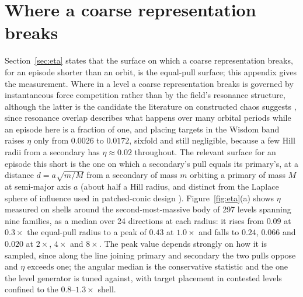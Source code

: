 \section{Where a coarse representation breaks}
\label{app:equalpull}

Section~\ref{sec:eta} states that the surface on which a coarse
representation breaks, for an episode shorter than an orbit, is the
equal-pull surface; this appendix gives the measurement.
Where in a level a coarse representation breaks is governed by instantaneous
force competition rather than by the field's resonance structure, although
the latter is the candidate the literature on constructed chaos suggests
\cite{chirikov1979,wisdom1980,deck2013}, since resonance overlap describes
what happens over many orbital periods while an episode here is a fraction
of one, and placing targets in the Wisdom band raises $\eta$ only from
$0.0026$ to $0.0172$, sixfold and still negligible, because a few Hill
radii from a secondary has $\eta \approx 0.02$ throughout. The relevant
surface for an episode this short is the one on which a secondary's pull
equals its primary's, at a distance $d = a\sqrt{m/M}$ from a secondary of
mass $m$ orbiting a primary of mass $M$ at semi-major axis $a$ (about half a
Hill radius, and distinct from the Laplace sphere of influence used in
patched-conic design \cite{bate1971}). Figure~\ref{fig:eta}(a) shows $\eta$
measured on shells around the second-most-massive body of 297 levels
spanning nine families, as a median over 24 directions at each radius: it
rises from $0.09$ at $0.3\times$ the equal-pull radius to a peak of $0.43$
at $1.0\times$ and falls to $0.24$, $0.066$ and $0.020$ at $2\times$,
$4\times$ and $8\times$. The peak value depends strongly on how it is
sampled, since along the line joining primary and secondary the two pulls
oppose and $\eta$ exceeds one; the angular median is the conservative
statistic and the one the level generator is tuned against, with target
placement in contested levels confined to the $0.8$--$1.3\times$ shell.

